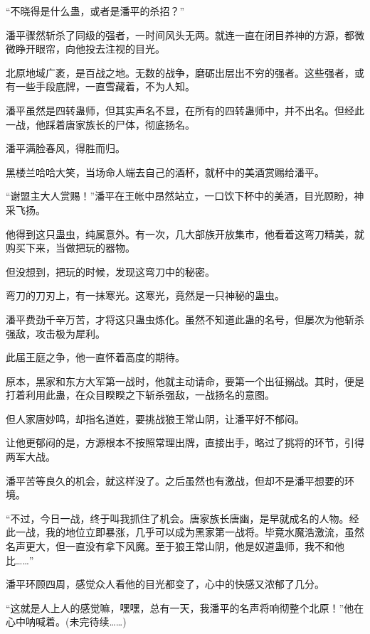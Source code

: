 \begin{this_body}
“不晓得是什么蛊，或者是潘平的杀招？”

潘平骤然斩杀了同级的强者，一时间风头无两。就连一直在闭目养神的方源，都微微睁开眼帘，向他投去注视的目光。

北原地域广袤，是百战之地。无数的战争，磨砺出层出不穷的强者。这些强者，或有一些手段底牌，一直雪藏着，不为人知。

潘平虽然是四转蛊师，但其实声名不显，在所有的四转蛊师中，并不出名。但经此一战，他踩着唐家族长的尸体，彻底扬名。

潘平满脸春风，得胜而归。

黑楼兰哈哈大笑，当场命人端去自己的酒杯，就杯中的美酒赏赐给潘平。

“谢盟主大人赏赐！”潘平在王帐中昂然站立，一口饮下杯中的美酒，目光顾盼，神采飞扬。

他得到这只蛊虫，纯属意外。有一次，几大部族开放集市，他看着这弯刀精美，就购买下来，当做把玩的器物。

但没想到，把玩的时候，发现这弯刀中的秘密。

弯刀的刀刃上，有一抹寒光。这寒光，竟然是一只神秘的蛊虫。

潘平费劲千辛万苦，才将这只蛊虫炼化。虽然不知道此蛊的名号，但屡次为他斩杀强敌，攻击极为犀利。

此届王庭之争，他一直怀着高度的期待。

原本，黑家和东方大军第一战时，他就主动请命，要第一个出征搦战。其时，便是打着利用此蛊，在众目睽睽之下斩杀强敌，一战扬名的意图。

但人家唐妙鸣，却指名道姓，要挑战狼王常山阴，让潘平好不郁闷。

让他更郁闷的是，方源根本不按照常理出牌，直接出手，略过了挑将的环节，引得两军大战。

潘平苦等良久的机会，就这样没了。之后虽然也有激战，但却不是潘平想要的环境。

“不过，今日一战，终于叫我抓住了机会。唐家族长唐幽，是早就成名的人物。经此一战，我的地位立即暴涨，几乎可以成为黑家第一战将。毕竟水魔浩激流，虽然名声更大，但一直没有拿下风魔。至于狼王常山阴，他是奴道蛊师，我不和他比……”

潘平环顾四周，感觉众人看他的目光都变了，心中的快感又浓郁了几分。

“这就是人上人的感觉嘛，嘿嘿，总有一天，我潘平的名声将响彻整个北原！”他在心中呐喊着。(未完待续……)

\end{this_body}

